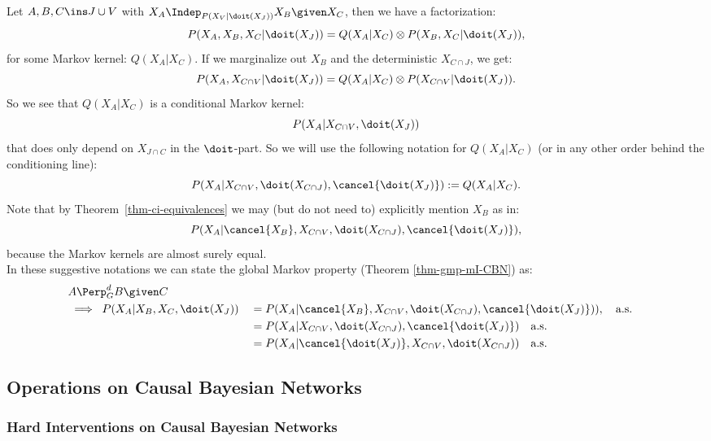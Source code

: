 \begin{Not}
    Let $A,B,C \ins J \cup V$ with $X_A \Indep_{P(X_V|\doit(X_J))} X_B \given X_C$, then we have a factorization:
    \[ P(X_A,X_B,X_C|\doit(X_J)) = Q(X_A|X_C) \otimes P(X_B,X_C|\doit(X_J)),\]
    for some Markov kernel: $Q(X_A|X_C)$. If we marginalize out $X_B$ and the deterministic $X_{C \cap J}$,
    we get:
    \[ P(X_A,X_{C\cap V}|\doit(X_J)) = Q(X_A|X_C) \otimes P(X_{C\cap V}|\doit(X_J)).\]
    So we see that $Q(X_A|X_C)$ is a conditional Markov kernel:
    \[P(X_A|X_{C\cap V},\doit(X_J)) \]
    that does only depend on $X_{J \cap C}$ in the $\doit$-part.
    So we will use the following notation for $Q(X_A|X_C)$ (or in any other order behind the conditioning line):
    \[ P(X_A|X_{C \cap V},\doit(X_{C \cap J}),\cancel{\doit(X_J)}) := Q(X_A|X_C).  \]
    Note that by Theorem~\ref{thm-ci-equivalences} we may (but do not need to) explicitly mention $X_B$ as in:
    \[ P(X_A|\cancel{X_B},X_{C \cap V},\doit(X_{C \cap J}),\cancel{\doit(X_J)}),  \]
    because the Markov kernels are almost surely equal.\\
    In these suggestive notations we can state the global Markov property (Theorem \ref{thm-gmp-mI-CBN}) as:
    \begin{align*} 
    &A \Perp^d_G B \given C \\
    &\implies \; P(X_A|X_B,X_C,\doit(X_J)) &&= P(X_A|\cancel{X_B},X_{C \cap V},\doit(X_{C \cap J}),\cancel{\doit(X_J)})),\quad \text{a.s.} \\
    & &&= P(X_A|X_{C \cap V},\doit(X_{C \cap J}),\cancel{\doit(X_J)}) \quad \text{a.s.}\\ 
    & &&= P(X_A|\cancel{\doit(X_J)},X_{C \cap V},\doit(X_{C \cap J})) \quad \text{a.s.}
    \end{align*}

\end{Not}




\subsection{Operations on Causal Bayesian Networks}
\subsubsection{Hard Interventions on Causal Bayesian Networks}

